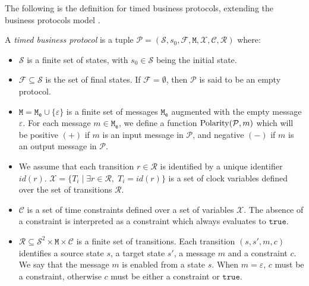 The following is the definition for timed business protocols, extending the business protocols model \cite{BBFC04,FTBB}.

\begin{definition}
A \emph{timed business protocol} is a tuple $\mathcal{P} = (\mathcal{S}, s_0, \mathcal{F}, \mathtt{M}, \mathcal{X}, \mathcal{C}, \mathcal{R})$ where:
\begin{itemize}

  \item $\mathcal{S}$ is a finite set of states, with $s_0 \in \mathcal{S}$ being the initial state.

  \item $\mathcal{F} \subseteq \mathcal{S}$ is the set of final states. If $\mathcal{F} = \emptyset$, then $\mathcal{P}$ is said to be an empty protocol.

  \item $\mathtt{M} = \mathtt{M_e} \cup \{\varepsilon\}$ is a finite set of messages $\mathtt{M_e}$ augmented with the empty message $\varepsilon$. For each message $m \in \mathtt{M_e}$, we define a function $\operatorname{Polarity}(\mathcal{P}, m)$ which will be positive $(+)$ if $m$ is an input message in $\mathcal{P}$, and negative $(-)$ if $m$ is an output message in $\mathcal{P}$.

  \item We assume that each transition $r \in \mathcal{R}$ is identified by a unique identifier $id(r)$. $\mathcal{X} = \{ T_i \;|\; \exists r \in \mathcal{R},\; T_i = id(r) \}$ is a set of clock variables defined over the set of transitions $\mathcal{R}$.

  \item $\mathcal{C}$ is a set of time constraints defined over a set of variables $\mathcal{X}$. The absence of a constraint is interpreted as a constraint which always evaluates to $\mathtt{true}$.

  \item $\mathcal{R} \subseteq \mathcal{S}^2 \times \mathtt{M} \times \mathcal{C}$ is a finite set of transitions.
  Each transition $(s, s', m, c)$ identifies a source state $s$, a target state $s'$, a message $m$ and a constraint $c$. We say that the message $m$ is enabled from a state $s$. When $m = \varepsilon$, $c$ must be a \MInvoke constraint,  otherwise $c$ must be either a \CInvoke constraint or $\mathtt{true}$.

\end{itemize}
\end{definition}

